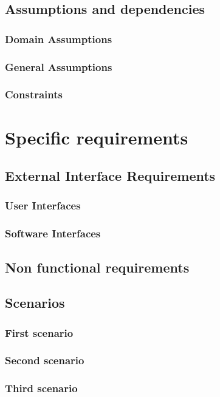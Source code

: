 \documentclass[12pt]{article}
\begin{document}
	\subsection{Assumptions and dependencies}
	\subsubsection{Domain Assumptions}
	
	
	\subsubsection{General Assumptions}
	
	\subsubsection{Constraints}
	
	
	\clearpage
	\section{Specific requirements}
	\subsection{External Interface Requirements}
	\subsubsection{User Interfaces}
	\subsubsection{Software Interfaces}
	
	\subsection{Non functional requirements}
	
	\subsection{Scenarios}
	\subsubsection{First scenario}
	
	\FloatBarrier
	\subsubsection{Second scenario}
	
	\FloatBarrier
	\clearpage
	\subsubsection{Third scenario}
	
	\FloatBarrier
	\clearpage
\end{document}
